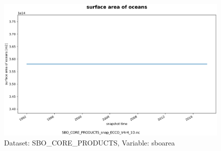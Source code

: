 \begin{figure}[H]
\centering
\includegraphics[scale=0.55]{../images/plots/oneD_plots/SBO_Core_Products/sboarea.png}
\caption{Dataset: SBO\_CORE\_PRODUCTS, Variable: sboarea}
\label{tab:table-SBO_CORE_PRODUCTS_sboarea-Plot}
\end{figure}
\newpage
\pagebreak
